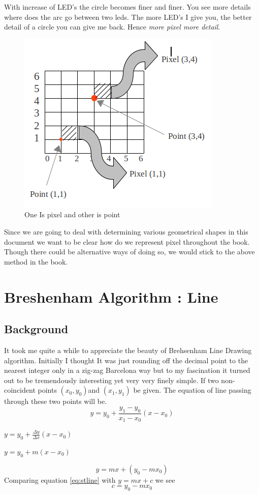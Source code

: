 \documentclass[a4paper,12pt,oneside]{book}
\begin{document}
\quad With increase of LED's the circle becomes finer and finer. You see more details where does the arc go between two leds. The more LED's I give you, the  better detail of a circle you can give me back. Hence \emph{more pixel more detail}.\\ \begin{figure}[hbtp]
\caption{One Is pixel and other is point}
\centering
\includegraphics[scale=.8]{Files/Images/PixelAndPoint.png}
\end{figure}

Since we are going to deal with determining various geometrical shapes in this document we want to be clear how do we represent pixel throughout the book. Though there could be alternative ways of doing so, we would stick to the above method in the book.

\chapter{Breshenham Algorithm : Line}
\section{Background}
It took me quite a while to appreciate the beauty of Brehsenham Line Drawing algorithm. Initially I thought It was just rounding off the decimal point to the nearest integer only in a zig-zag Barcelona way but to my fascination it turned out to be tremendously interesting yet very very finely simple.
 If two non-coincident points $(x_0,y_0)$and $(x_1,y_1)$ be given. The equation of line passing through these two points will be.
\begin{equation} \label{eq:basiceq}
	y=y_0+\frac{y_1-y_0}{x_1-x_0} (x-x_0)
\end{equation}
\begin{center}
	$y=y_0+\frac{\Delta y}{\Delta x} (x-x_0)$
\end{center}
\begin{center}
	$y=y_0+m (x-x_0)$
\end{center}
\begin{equation} \label{eq:stline}
	y=mx+ (y_0 -mx_0)
\end{equation}
Comparing equation \ref{eq:stline} with $y=mx+c$ we see
\begin{equation} \label{eq:valueofc}
	c=y_0-mx_0
\end{equation}
\end{document}
